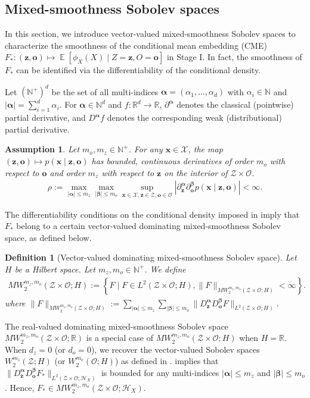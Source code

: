 \documentclass[11pt]{article}
\newcommand{\bx}{\mathbf x}
\newcommand{\bz}{\mathbf z}
\newcommand{\bo}{\mathbf o}
\newcommand{\calZ}{\mathcal{Z}}
\newcommand{\calH}{\mathcal{H}}
\newcommand{\calO}{\mathcal{O}}
\newcommand{\calX}{\mathcal{X}}
\newcommand{\R}{\mathbb{R}}
\newcommand{\0}{\mathbf{0}}
\newcommand{\balpha}{\boldsymbol\alpha}
\newcommand{\bbeta}{\boldsymbol\beta}
\DeclareMathOperator{\E}{\mathbb{E}}
\newtheorem{defi}{Definition}
\newtheorem{ass}{Assumption}[section]
\begin{document}
\subsection{Mixed-smoothness Sobolev spaces}
\label{sec:mixed_smooth_ss}
In this section, we introduce vector-valued mixed-smoothness Sobolev spaces to characterize the smoothness of the conditional mean embedding (CME) $F_{\ast}: (\bz, \bo) \mapsto \E[\phi_{X}(X) \mid Z=\bz, O=\bo]$ in Stage I. 
In fact, the smoothness of $F_{\ast}$ can be identified via the differentiability of the conditional density.


Let $(\mathbb{N}^{+})^{d}$ be the set of all multi-indices $\balpha = (\alpha_1,\dots,\alpha_d)$ with $\alpha_i\in \mathbb{N}$ and $|\balpha| = \sum_{i=1}^{d}\alpha_i$.  
For $\balpha\in \mathbb{N}^{d}$ and $f: \R^d \to \R$,  $\partial^{\balpha}$ denotes the classical (pointwise) partial derivative, and $D^{\balpha} f$ denotes the corresponding weak (distributional) partial derivative. 

\begin{ass}\label{assn: technical}
Let $m_o, m_z \in \mathbb{N}^+$. For any $\bx\in\calX$, the map $(\bz,\bo)\mapsto p(\bx\mid\bz,\bo)$ has bounded, continuous derivatives of order $m_o$ with respect to $\bo$ and order $m_z$ with respect to $\bz$ on the interior of $\calZ\times \calO$. 
\begin{align*}
    \rho := \max_{|\balpha|\leq m_z}\max_{|\bbeta|\leq m_o}\sup_{\bx \in \calX ,\bz\in\calZ,\bo\in\calO} \left|\partial^{\balpha}_{\bz}\partial^{\bbeta}_{\bo}p(\bx\mid \bz,\bo)\right|< \infty. 
\end{align*}
\end{ass}
The differentiability conditions on the conditional density imposed in  imply that $F_\ast$ belong to a certain vector-valued dominating mixed-smoothness Sobolev space, as defined below.
\begin{defi}[Vector-valued dominating mixed-smoothness Sobolev space]
Let $H$ be a Hilbert space. Let $m_z,m_o\in \mathbb{N}^+$. We define
\begin{align*}
    MW^{m_z,m_o}_2(\calZ\times \calO; H):=\left\{ F \mid F \in L^2(\calZ\times \calO; H), \|F\|_{MW^{m_z,m_o}_2(\calZ\times \calO; H)} <\infty \right\} .
\end{align*}
where $\|F\|_{MW^{m_z,m_o}_2(\calZ\times \calO; H)} := \sum_{|\balpha|\leq m_z}\sum_{|\bbeta|\leq m_o} \| D^{\balpha}_{\bz} D^{\bbeta}_{\bo} F \|_{L^2(\calZ\times \calO; H)}$.
\end{defi}
The real-valued dominating mixed-smoothness Sobolev space~\citep{schmeisser1987unconditional, schmeisser2007recent, SICKEL2009748} $MW^{m_z,m_o}_2(\calZ\times\calO; \mathbb{R})$ is a special case of $MW^{m_z,m_o}_{2}(\calZ\times\calO;H)$ when $H = \mathbb{R}$. 
When $d_z =0$ (or $d_o = 0$), we recover the vector-valued Sobolev spaces $W^{m_z}_2(\calZ; H)$ (or $W^{m_o}_2(\calO; H)$) as defined in \citet[Section 12.7]{aubin2011applied}.
 implies that $\|D_{\bz}^{\balpha}D^{\bbeta}_{\bo}F_{\ast}\|_{L^2(\calZ\times\calO;\calH_{X})}$ is bounded for any multi-indices  $|\balpha|\leq m_z$ and $|\bbeta|\leq m_o$. Hence, $F_{\ast}\in MW^{m_z, m_o}_2(\calZ\times \calO;\calH_{X})$. 
\end{document}
